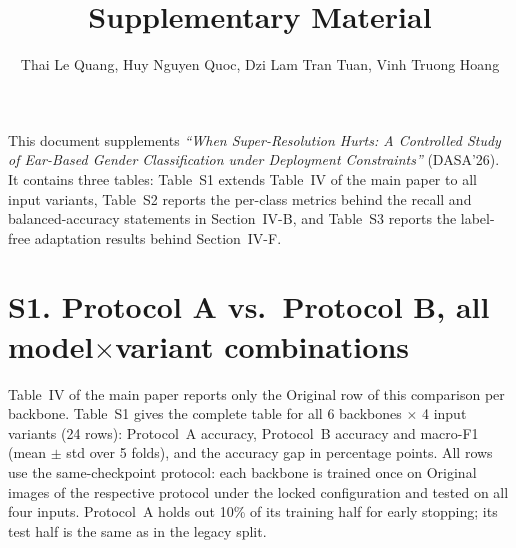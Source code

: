 \documentclass[11pt]{article}
\title{Supplementary Material}
\author{Thai Le Quang, Huy Nguyen Quoc, Dzi Lam Tran Tuan, Vinh Truong Hoang}
\date{}
\begin{document}
\maketitle

\noindent This document supplements \emph{``When Super-Resolution Hurts: A Controlled Study of Ear-Based Gender Classification under Deployment Constraints''} (DASA'26). It contains three tables: Table~S1 extends Table~IV of the main paper to all input variants, Table~S2 reports the per-class metrics behind the recall and balanced-accuracy statements in Section~IV-B, and Table~S3 reports the label-free adaptation results behind Section~IV-F.

\section*{S1. Protocol A vs.\ Protocol B, all model$\times$variant combinations}
\noindent Table~IV of the main paper reports only the Original row of this comparison per backbone. Table~S1 gives the complete table for all 6 backbones $\times$ 4 input variants (24 rows): Protocol~A accuracy, Protocol~B accuracy and macro-F1 (mean $\pm$ std over 5 folds), and the accuracy gap in percentage points. All rows use the same-checkpoint protocol: each backbone is trained once on Original images of the respective protocol under the locked configuration and tested on all four inputs. Protocol~A holds out 10\% of its training half for early stopping; its test half is the same as in the legacy split.

\bigskip
\end{document}
